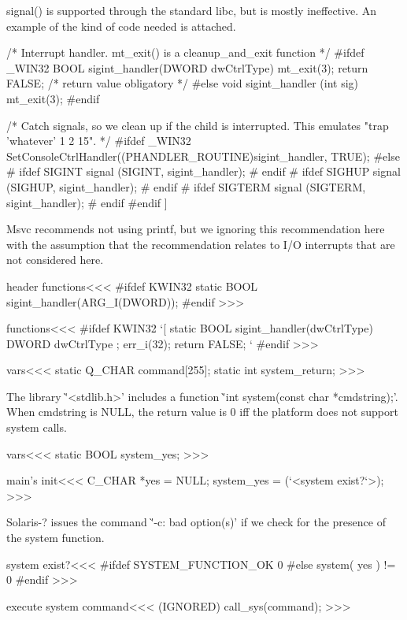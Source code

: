 {{{{{{{signal() is supported through the standard libc, but is mostly
ineffective. An example of the kind of code needed is attached.


/* Interrupt handler. mt_exit() is a cleanup_and_exit function */
#ifdef _WIN32
BOOL sigint_handler(DWORD dwCtrlType)
{
  mt_exit(3);
  return FALSE;      /* return value obligatory */
}
#else
void sigint_handler (int sig)
{
  mt_exit(3);
}
#endif

  /* Catch signals, so we clean up if the child is interrupted.
     This emulates "trap 'whatever' 1 2 15".  */
#ifdef _WIN32
  SetConsoleCtrlHandler((PHANDLER_ROUTINE)sigint_handler, TRUE);
#else
# ifdef SIGINT
  signal (SIGINT, sigint_handler);
# endif
# ifdef SIGHUP
  signal (SIGHUP, sigint_handler);
# endif
# ifdef SIGTERM
  signal (SIGTERM, sigint_handler);
# endif
#endif
\EndVerbatim\EndHPage{}]\fi

Msvc recommends not using printf, but we ignoring this recommendation
here with the assumption that the recommendation relates to I/O
interrupts that are not considered here.




\<header functions\><<<
#ifdef KWIN32
static BOOL sigint_handler(ARG_I(DWORD));
#endif
>>>

\<functions\><<<
#ifdef KWIN32
`[
static BOOL sigint_handler(dwCtrlType)     DWORD dwCtrlType
;{
  err_i(32);
  return FALSE;      `%
}
#endif
>>>





\<vars\><<<
static Q_CHAR command[255];
static int system_return;
>>>


The library \`'<stdlib.h>' includes a function
\`'int system(const char *cmdstring);'.   When cmdstring is NULL,
the return value is 0 iff the platform does not support system calls.


\<vars\><<<
static BOOL system_yes;
>>>

\<main's init\><<<
{                   C_CHAR   *yes = NULL;
  system_yes = (`<system exist?`>);
}
>>>


Solaris-? issues the command \`'-c: bad option(s)' if we check for the
presence of the system function.



\<system exist?\><<<
#ifdef SYSTEM_FUNCTION_OK
0
#else
system( yes ) != 0
#endif
>>>

\<execute system command\><<<
(IGNORED) call_sys(command);
>>>




}}}}}}}

